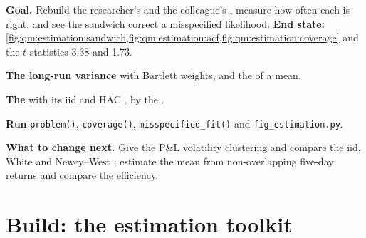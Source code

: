 \begin{tutorial}
\textbf{Goal.} Rebuild the researcher's and the colleague's , measure how often each is right, and see the
sandwich correct a misspecified likelihood. \textbf{End state:}
\cref{fig:qm:estimation:sandwich,fig:qm:estimation:acf,fig:qm:estimation:coverage} and the $t$-statistics 3.38 and 1.73.
\begin{tutsteps}
\item \textbf{The long-run variance} with Bartlett weights, and the  of a mean.
\label{lst:qm:estimation:nw}
\item \textbf{The } with its iid and HAC , by the .
\label{lst:qm:estimation:sharpe}
\item \textbf{Run} \texttt{problem()}, \texttt{coverage()}, \texttt{misspecified\_fit()} and \texttt{fig\_estimation.py}.
\end{tutsteps}
\textbf{What to change next.} Give the P\&L volatility clustering and compare the iid, White and Newey--West ;
estimate the mean from non-overlapping five-day returns and compare the efficiency.
\end{tutorial}

\section{Build: the estimation toolkit}\label{bld:qm:estimation:estim}

